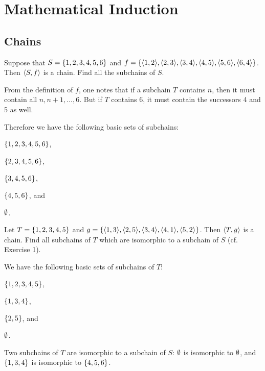 \chapter{Mathematical Induction}
\section{Chains}
\begin{exercise}
Suppose that $S = \left\{1, 2,3,4,5, 6\right\}$ and
$f = \set{\aprn{1,2},\aprn{2,3},\aprn{3,4},\aprn{4,5}, \aprn{5,6},\aprn{6,4}}$.
Then $\left\langle S, f\right\rangle$ is a chain. Find all the subchains of $S$.
\end{exercise}

\begin{solution}
From the definition of $f$, one notes that if a subchain $T$ contains $n$,
then it must contain all $n,n+1,\dots,6$. But if $T$ contains 6, it must contain the
successors 4 and 5 as well.

Therefore we have the following basic sets of subchains: 
\begin{enumroman}
    \item $\left\{1, 2,3,4,5, 6\right\}$,
    \item $\left\{2,3,4,5, 6\right\}$,
    \item $\left\{3,4,5, 6\right\}$,
    \item $\left\{4,5, 6\right\}$, and
    \item $\emptyset$.
\end{enumroman}
\end{solution}

\begin{exercise}
Let $T =\left\{1, 2,3, 4,5\right\}$ and $g = \set{\aprn{1,3},\aprn{2,5},\aprn{3,4}, \aprn{4,1},\aprn{5,2}}$.
Then $\left\langle T,g\right\rangle$ is a chain. Find all subchains of $T$ which are isomorphic to a
subchain of $S$ (cf. Exercise 1).
\end{exercise}

\begin{solution}
We have the following basic sets of subchains of $T$: 
\begin{enumroman}
    \item $\left\{1,2,3,4,5\right\}$,
    \item $\left\{1,3,4\right\}$,
    \item $\left\{2,5\right\}$, and
    \item $\emptyset$.
\end{enumroman}
Two subchains of $T$ are isomorphic to a subchain of $S$: $\emptyset$ is isomorphic to $\emptyset$, and $\left\{1,3,4\right\}$
is isomorphic to $\left\{4,5, 6\right\}$. 
\end{solution}


